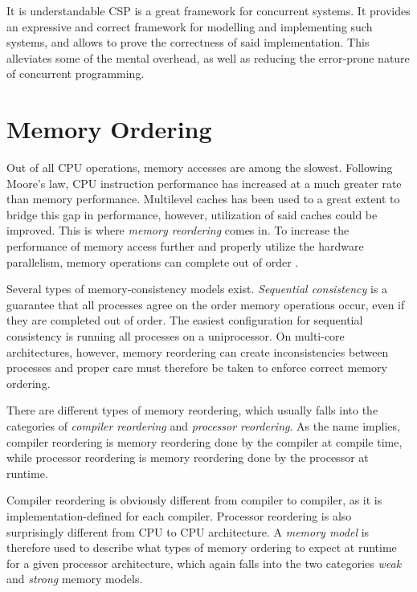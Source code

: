 It is understandable CSP is a great framework for concurrent systems. It provides an expressive and correct framework for modelling and implementing such systems, and allows to prove the correctness of said implementation. This alleviates some of the mental overhead, as well as reducing the error\hyp{}prone nature of concurrent programming.


\section{Memory Ordering}
\label{sec:memory_ordering}


Out of all CPU operations, memory accesses are among the slowest. Following Moore's law, CPU instruction performance has increased at a much greater rate than memory performance. Multilevel caches has been used to a great extent to bridge this gap in performance, however, utilization of said caches could be improved. This is where \textit{memory reordering} comes in. To increase the performance of memory access further and properly utilize the hardware parallelism, memory operations can complete out of order \citep{mckenney2007memory}.

Several types of memory\hyp{}consistency models exist. \textit{Sequential consistency} is a guarantee that all processes agree on the order memory operations occur, even if they are completed out of order. The easiest configuration for sequential consistency is running all processes on a uniprocessor. On multi\hyp{}core architectures, however, memory reordering can create inconsistencies between processes and proper care must therefore be taken to enforce correct memory ordering. 

There are different types of memory reordering, which usually falls into the categories of \textit{compiler reordering} and \textit{processor reordering}. As the name implies, compiler reordering is memory reordering done by the compiler at compile time, while processor reordering is memory reordering done by the processor at runtime.

Compiler reordering is obviously different from compiler to compiler, as it is implementation\hyp{}defined for each compiler. Processor reordering is also surprisingly different from CPU to CPU architecture. A \textit{memory model} is therefore used to describe what types of memory ordering to expect at runtime for a given processor architecture, which again falls into the two categories \textit{weak} and \textit{strong} memory models.

